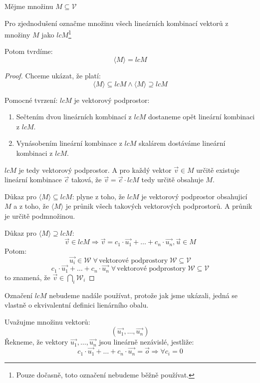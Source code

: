 \begin{theorem}
    Mějme množinu $M \subseteq \mathcal{V}$

    Pro zjednodušení označme množinu všech lineárních kombinací
    vektorů z množiny $M$ jako $lcM$\footnote{Pouze dočasně, toto
    označení nebudeme běžně používat.}

    Potom tvrdíme:
    $$\langle M \rangle = lcM$$
\end{theorem}
\begin{proof}
    Chceme ukázat, že platí:
    $$\langle M \rangle \subseteq lcM \wedge \langle M \rangle \supseteq lcM$$

    Pomocné tvrzení: $lcM$ je vektorový podprostor:
    \begin{enumerate}
        \item Sečtením dvou lineárních kombinací z $lcM$ dostaneme opět lineární kombinaci z $lcM$.
        \item Vynásobením lineární kombinace z $lcM$ skalárem dostáváme lineární kombinaci z $lcM$.
    \end{enumerate}
    $lcM$ je tedy vektorový podprostor. A pro každý vektor $\vec{v} \in M$ určitě existuje
    lineární kombinace $\vec{c}$ taková, že $\vec{v} = \vec{c} \cdot lcM$ tedy určitě
    obsahuje $M$.

    Důkaz pro $\langle M \rangle \subseteq lcM$: plyne z toho, že $lcM$ je vektorový
    podprostor obsahujicí $M$ a z toho, že $\langle M \rangle$ je průnik všech takových vektorových
    podprostorů. A průnik je určitě podmnožinou.

    Důkaz pro $\langle M \rangle \supseteq lcM$:
    $$\vec{v} \in lcM \Rightarrow \vec{v} = c_1
        \cdot \vec{u_1} + \ldots + c_n \cdot \vec{u_n}, \vec{u} \in M$$
    Potom:
    $$\vec{u_i} \in \mathcal{W}\; \forall\,\text{vektorové podprostory}\;
        \mathcal{W} \subseteq \mathcal{V}$$
    $$c_1 \cdot \vec{u_1} + \ldots + c_n \cdot \vec{u_n} \; \forall
    \, \text{vektorové podprostory}\; \mathcal{W} \subseteq \mathcal{V}$$
    to znamená, že $\vec{v} \in \bigcap\limits_{i} \mathcal{W}_i$
\end{proof}

Označení $lcM$ nebudeme nadále používat, protože jak jsme ukázali, jedná se vlastně
o ekvivalentní definici lienárního obalu.

\begin{definition}
    \label{def:lin_nezavislost}
    Uvažujme množinu vektorů:
    $$(\vec{u_1}, \ldots, \vec{u_n})$$
    Řekneme, že vektory $\vec{u_1}, \ldots, \vec{u_n}$ jsou lineárně nezávislé,
    jestliže:
    $$c_1\cdot\vec{u_1}+\ldots +c_n\cdot\vec{u_n} = \vec{o} \Rightarrow \forall c_i = 0$$
\end{definition}

